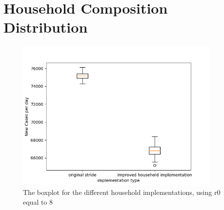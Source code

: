 \documentclass[runningheads]{llncs}
\begin{document}
	\section{Household Composition Distribution}
	\begin{figure}
		\centering
		\includegraphics[width=0.9\textwidth]{household_r08_boxplot.png}	
		\caption{The boxplot for the different household implementations, using r0 equal to 8}
		\label{fig7}
	\end{figure}
\end{document}
